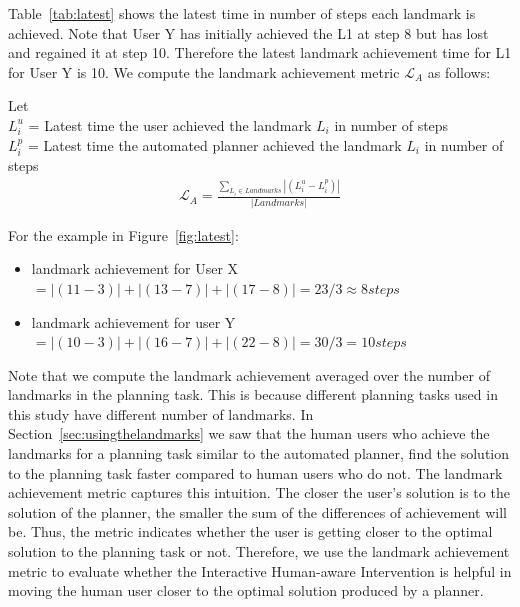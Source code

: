 Table~\ref{tab:latest} shows the latest time in number of steps each landmark is achieved.
Note that User Y has initially achieved the L1 at step 8 but has lost and regained it at step 10.
Therefore the latest landmark achievement time for L1 for User Y is 10.
We compute the landmark achievement metric $\mathcal{L}_A$ as follows:

Let\\
 $L_{i}^u$ = \textup{Latest time the user achieved the landmark $L_i$ in number of steps}\\
 $L_{i}^p$ = \textup{Latest time the automated planner achieved the landmark $L_i$ in number of steps}
 \begin{align}
	\mathcal{L}_A = \frac{\sum_{L_i \in Landmarks} \left | (L_i^u - L_i^p) \right |}{|Landmarks|} 
 \end{align}
 
For the example in Figure~\ref{fig:latest}:
\begin{itemize}
\item landmark achievement for User X $= |(11-3)| + |(13-7)| + |(17-8)| = 23/3 \approx 8 steps$
\item landmark achievement for user Y $=|(10-3)| + |(16-7)| + |(22-8)|=30/3 = 10 steps$
\end{itemize}
Note that we compute the landmark achievement averaged over the number of landmarks in the planning task.
This is because different planning tasks used in this study have different number of landmarks.
In Section~\ref{sec:usingthelandmarks} we saw that the human users who achieve the landmarks for a planning task similar to the automated planner, find the solution to the planning task faster compared to human users who do not.
The landmark achievement metric captures this intuition.
The closer the user's solution is to the solution of the planner, the smaller the sum of the differences of achievement will be.
Thus, the metric indicates whether the user is getting closer to the optimal solution to the planning task or not.
Therefore, we use the landmark achievement metric to evaluate whether the Interactive Human-aware Intervention is helpful in moving the human user closer to the optimal solution produced by a planner.


